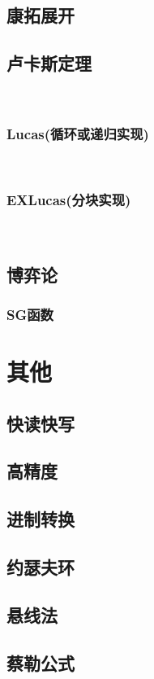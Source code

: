 \documentclass[twocolumn,a4]{article}
\newcommand{\addcpp}[1]{}
\begin{document}
	\subsection{康拓展开}
		\addcpp{math/contor}
	\subsection{卢卡斯定理}
		​\subsubsection{Lucas(循环或递归实现)}
		​	\addcpp{math/Lucas}
		​\subsubsection{EXLucas(分块实现)}
		​	\addcpp{math/EXLucas}
	\subsection{博弈论}
		\subsubsection{SG函数}
			\addcpp{math/SG}

\section{其他}
	\subsection{快读快写}
		\addcpp{other/fast_io}
	\subsection{高精度}
		\addcpp{other/big_num}
	\subsection{进制转换}
		\addcpp{other/base}
	\subsection{约瑟夫环}
	\subsection{悬线法}
	\subsection{蔡勒公式}
\end{document}
